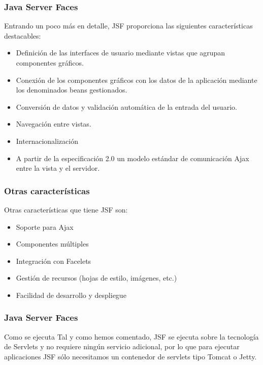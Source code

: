 \documentclass{beamer}
\begin{document}
\begin{frame}[fragile]
  \frametitle{Java Server Faces}

  Entrando un poco más en detalle, JSF proporciona las siguientes
  características destacables:

  \begin{itemize}[<+->]
    \item Definición de las interfaces de usuario mediante vistas que
      agrupan componentes gráficos.
    \item Conexión de los componentes gráficos con los datos de la
      aplicación mediante los denominados beans gestionados.
    \item Conversión de datos y validación automática de la entrada del usuario.
    \item Navegación entre vistas.
    \item Internacionalización
    \item A partir de la especificación 2.0 un modelo estándar de
      comunicación Ajax entre la vista y el servidor.
  \end{itemize}
\end{frame}

\begin{frame}[fragile]
  \frametitle{Otras características}
  Otras características que tiene JSF son:

  \begin{itemize}[<+->]
    \item Soporte para Ajax
    \item Componentes múltiples
    \item Integración con Facelets
    \item Gestión de recursos (hojas de estilo, imágenes, etc.)
    \item Facilidad de desarrollo y despliegue
  \end{itemize}

\end{frame}

\begin{frame}[fragile]
  \frametitle{Java Server Faces}

  \begin{block}{Como se ejecuta}
    Tal y como hemos comentado, JSF se ejecuta sobre la tecnología de
    Servlets y no requiere ningún servicio adicional, por lo que para
    ejecutar aplicaciones JSF sólo necesitamos un contenedor de servlets
    tipo Tomcat o Jetty.
  \end{block}

\end{frame}
\end{document}
